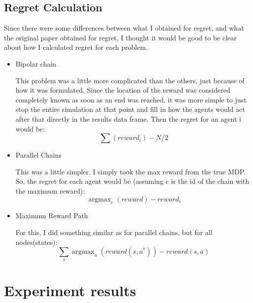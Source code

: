 \documentclass{article}
\DeclareMathOperator*{\argmax}{argmax}
\begin{document}
\subsection{Regret Calculation}
Since there were some differences between what I obtained for regret, and what the original paper obtained for regret, I thought it would be good to be clear about how I calculated regret for each problem.
\begin{itemize}
\item Bipolar chain

This problem was a little more complicated than the others, just because of how it was formulated. Since the location of the reward was considered completely known as soon as an end was reached, it was more simple to just stop the entire simulation at that point and fill in how the agents would act after that directly in the results data frame. Then the regret for an agent i would be:
$$\sum(reward_i) - N/2 $$

\item Parallel Chains

This was a little simpler. I simply took the max reward from the true MDP.
So, the regret for each agent would be (assuming c is the id of the chain with the maximum reward):
$$\argmax_c(reward) - reward_{i}$$

\item Maximum Reward Path

For this, I did something similar as for parallel chains, but for all nodes(states):
$$\sum_s \argmax_a(reward(s, a^*)) - reward(s, a) $$
\end{itemize}
\section{Experiment results}
\end{document}
